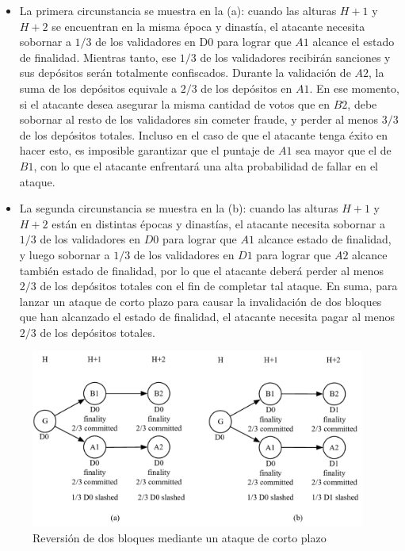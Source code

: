 \begin{itemize}
\item La primera circunstancia se muestra en la  (a): cuando las alturas $H+1$ y $H+2$ se encuentran en la misma época y dinastía, el atacante necesita sobornar a $1/3$ de los validadores en D0 para lograr que $A1$ alcance el estado de finalidad. Mientras tanto, ese $1/3$ de los validadores recibirán sanciones y sus depósitos serán totalmente confiscados. Durante la validación de $A2$, la suma de los depósitos equivale a $2/3$ de los depósitos en $A1$. En ese momento, si el atacante desea asegurar la misma cantidad de votos que en $B2$, debe sobornar al resto de los validadores sin cometer fraude, y perder al menos $3/3$ de los depósitos totales. Incluso en el caso de que el atacante tenga éxito en hacer esto, es imposible garantizar que el puntaje de $A1$ sea mayor que el de $B1$, con lo que el atacante enfrentará una alta probabilidad de fallar en el ataque.

\item La segunda circunstancia se muestra en la  (b): cuando las alturas $H+1$ y $H+2$ están en distintas épocas y dinastías, el atacante necesita sobornar a $1/3$ de los validadores en $D0$ para lograr que $A1$ alcance estado de finalidad, y luego sobornar a $1/3$ de los validadores en $D1$ para lograr que $A2$ alcance también estado de finalidad, por lo que el atacante deberá perder al menos $2/3$ de los depósitos totales con el fin de completar tal ataque. En suma, para lanzar un ataque de corto plazo para causar la invalidación de dos bloques que han alcanzado el estado de finalidad, el atacante necesita pagar al menos $2/3$ de los depósitos totales.
\end{itemize}

\begin{figure}[h]
\centering
\includegraphics[width=11cm]{./figs/revert2}
\caption{Reversión de dos bloques mediante un ataque de corto plazo}
\label{fig:revert2}
\end{figure}

